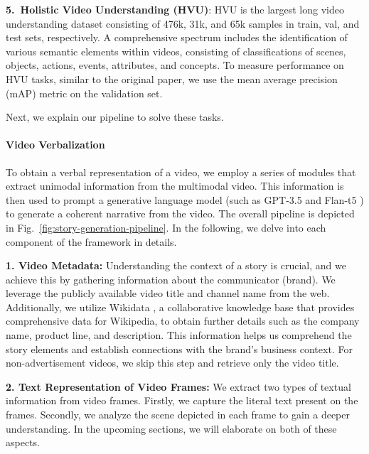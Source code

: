 \textbf{5.~Holistic Video Understanding (HVU)}: 
HVU \cite{diba2020large} is the largest long video understanding dataset consisting of 476k, 31k, and 65k samples in train, val, and test sets, respectively. A comprehensive spectrum includes the identification of various semantic elements within videos, consisting of classifications of scenes, objects, actions, events, attributes, and concepts. To measure performance on HVU tasks, similar to the original paper, we use the mean average precision (mAP) metric on the validation set.



Next, we explain our pipeline to solve these tasks.

\paragraph{Video Verbalization} 
To obtain a verbal representation of a video, we employ a series of modules that extract unimodal information from the multimodal video. This information is then used to prompt a generative language model (such as GPT-3.5 \cite{brown2020language} and Flan-t5 \cite{chung2022scaling}) to generate a coherent narrative from the video. The overall pipeline is depicted in Fig.~\ref{fig:story-generation-pipeline}. In the following, we delve into each component of the framework in details.

\noindent \textbf{1. Video Metadata:} Understanding the context of a story is crucial, and we achieve this by gathering information about the communicator (brand). We leverage the publicly available video title and channel name from the web. Additionally, we utilize Wikidata \cite{10.1145/2629489}, a collaborative knowledge base that provides comprehensive data for Wikipedia, to obtain further details such as the company name, product line, and description. This information helps us comprehend the story elements and establish connections with the brand's business context. For non-advertisement videos, we skip this step and retrieve only the video title.

\noindent \textbf{2. Text Representation of Video Frames:} We extract two types of textual information from video frames. Firstly, we capture the literal text present on the frames. Secondly, we analyze the scene depicted in each frame to gain a deeper understanding. In the upcoming sections, we will elaborate on both of these aspects.


